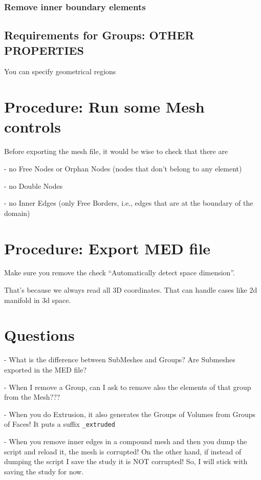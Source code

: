 \documentclass[10pt]{book}
\begin{document}
   
\subsection{Remove inner boundary elements}

  
 \section{Requirements for Groups: OTHER PROPERTIES}
 
 You can specify geometrical regions
 
 
  
 \chapter{Procedure: Run some Mesh controls}
 
 Before exporting the mesh file, it would be wise to check that there are 
  
  - no Free Nodes or Orphan Nodes (nodes that don't belong to any element)
  
  - no Double Nodes
  
  - no Inner Edges (only Free Borders, i.e., edges that are at the boundary of the domain)
  
  
 \chapter{Procedure: Export MED file}
 
  Make sure you remove the check ``Automatically detect space dimension''.
  
  That's because we always read all 3D coordinates.
  That can handle cases like 2d manifold in 3d space.
  
  

 

 \chapter{Questions}

- What is the difference between SubMeshes and Groups? Are Submeshes exported in the MED file?

- When I remove a Group, can I ask to remove also the elements of that group from the Mesh???

- When you do Extrusion, it also generates the Groups of Volumes from Groups of Faces! It puts a suffix \verb|_extruded|

- When you remove inner edges in a compound mesh and then you dump the script and reload it, the mesh is corrupted! 
On the other hand, if instead of dumping the script I save the study it is NOT corrupted! So, I will stick with saving the study for now.
\end{document}
